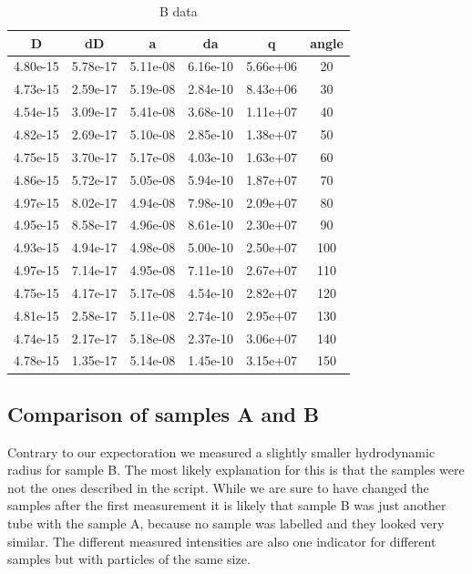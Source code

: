 \documentclass[]{article}
\begin{document}
\begin{table}[!htbp]
	\centering
	\begin{tabular}{|c|c|c|c|c|c|}
		\hline
		D & dD & a & da & q & angle \\ \hline\hline
		4.80e-15 & 5.78e-17 & 5.11e-08 & 6.16e-10 & 5.66e+06 & 20 \\ \hline
		4.73e-15 & 2.59e-17 & 5.19e-08 & 2.84e-10 & 8.43e+06 & 30 \\ \hline
		4.54e-15 & 3.09e-17 & 5.41e-08 & 3.68e-10 & 1.11e+07 & 40 \\ \hline
		4.82e-15 & 2.69e-17 & 5.10e-08 & 2.85e-10 & 1.38e+07 & 50 \\ \hline
		4.75e-15 & 3.70e-17 & 5.17e-08 & 4.03e-10 & 1.63e+07 & 60 \\ \hline
		4.86e-15 & 5.72e-17 & 5.05e-08 & 5.94e-10 & 1.87e+07 & 70 \\ \hline
		4.97e-15 & 8.02e-17 & 4.94e-08 & 7.98e-10 & 2.09e+07 & 80 \\ \hline
		4.95e-15 & 8.58e-17 & 4.96e-08 & 8.61e-10 & 2.30e+07 & 90 \\ \hline
		4.93e-15 & 4.94e-17 & 4.98e-08 & 5.00e-10 & 2.50e+07 & 100 \\ \hline
		4.97e-15 & 7.14e-17 & 4.95e-08 & 7.11e-10 & 2.67e+07 & 110 \\ \hline
		4.75e-15 & 4.17e-17 & 5.17e-08 & 4.54e-10 & 2.82e+07 & 120 \\ \hline
		4.81e-15 & 2.58e-17 & 5.11e-08 & 2.74e-10 & 2.95e+07 & 130 \\ \hline
		4.74e-15 & 2.17e-17 & 5.18e-08 & 2.37e-10 & 3.06e+07 & 140 \\ \hline
		4.78e-15 & 1.35e-17 & 5.14e-08 & 1.45e-10 & 3.15e+07 & 150 \\ \hline
		\hline
	\end{tabular}
	\caption{B data}
	\label{tab:bdata}
\end{table}

\subsection{Comparison of samples A and B}
Contrary to our expectoration we measured a slightly smaller hydrodynamic radius for sample B. The most likely explanation for this is that the samples were not the ones described in the script. While we are sure to have changed the samples after the first measurement it is likely that sample B was just another tube with the sample A, because no sample was labelled and they looked very similar. The different measured intensities are also one indicator for different samples but with particles of the same size.
\end{document}
